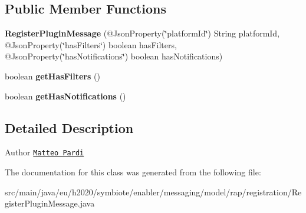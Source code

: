 \subsection*{Public Member Functions}
\begin{DoxyCompactItemize}
\item 
\mbox{\label{classeu_1_1h2020_1_1symbiote_1_1enabler_1_1messaging_1_1model_1_1rap_1_1registration_1_1RegisterPluginMessage_a093b918f255f7bbbb5addb3fa070f641}} 
{\bfseries Register\+Plugin\+Message} (@Json\+Property(\char`\"{}platform\+Id\char`\"{}) String platform\+Id, @Json\+Property(\char`\"{}has\+Filters\char`\"{}) boolean has\+Filters, @Json\+Property(\char`\"{}has\+Notifications\char`\"{}) boolean has\+Notifications)
\item 
\mbox{\label{classeu_1_1h2020_1_1symbiote_1_1enabler_1_1messaging_1_1model_1_1rap_1_1registration_1_1RegisterPluginMessage_a07a4e8540c86b5391af36809d8be08f1}} 
boolean {\bfseries get\+Has\+Filters} ()
\item 
\mbox{\label{classeu_1_1h2020_1_1symbiote_1_1enabler_1_1messaging_1_1model_1_1rap_1_1registration_1_1RegisterPluginMessage_a2035c49de11c58c5e289fa6ea4b7b753}} 
boolean {\bfseries get\+Has\+Notifications} ()
\end{DoxyCompactItemize}


\subsection{Detailed Description}
\begin{DoxyAuthor}{Author}
\href{mailto:m.pardi@nextworks.it}{\tt Matteo Pardi} 
\end{DoxyAuthor}


The documentation for this class was generated from the following file\+:\begin{DoxyCompactItemize}
\item 
src/main/java/eu/h2020/symbiote/enabler/messaging/model/rap/registration/Register\+Plugin\+Message.\+java\end{DoxyCompactItemize}
